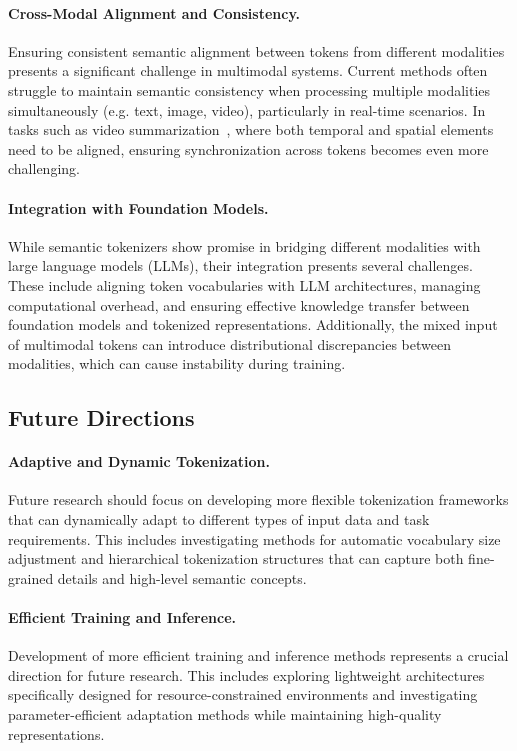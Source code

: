 \paragraph{Cross-Modal Alignment and Consistency.} 
Ensuring consistent semantic alignment between tokens from different modalities presents a significant challenge in multimodal systems. 
Current methods often struggle to maintain semantic consistency when processing multiple modalities simultaneously (e.g. text, image, video), particularly in real-time scenarios. 
In tasks such as video summarization~\cite{li2023blip}, where both temporal and spatial elements need to be aligned, ensuring synchronization across tokens becomes even more challenging.


\paragraph{Integration with Foundation Models.} 
While semantic tokenizers show promise in bridging different modalities with large language models (LLMs), their integration presents several challenges. 
These include aligning token vocabularies with LLM architectures, managing computational overhead, and ensuring effective knowledge transfer between foundation models and tokenized representations.
Additionally, the mixed input of multimodal tokens can introduce distributional discrepancies between modalities,  which can cause instability during training.


\subsection{Future Directions}

\paragraph{Adaptive and Dynamic Tokenization.} Future research should focus on developing more flexible tokenization frameworks that can dynamically adapt to different types of input data and task requirements. This includes investigating methods for automatic vocabulary size adjustment and hierarchical tokenization structures that can capture both fine-grained details and high-level semantic concepts.

\paragraph{Efficient Training and Inference.} Development of more efficient training and inference methods represents a crucial direction for future research. This includes exploring lightweight architectures specifically designed for resource-constrained environments and investigating parameter-efficient adaptation methods while maintaining high-quality representations.


